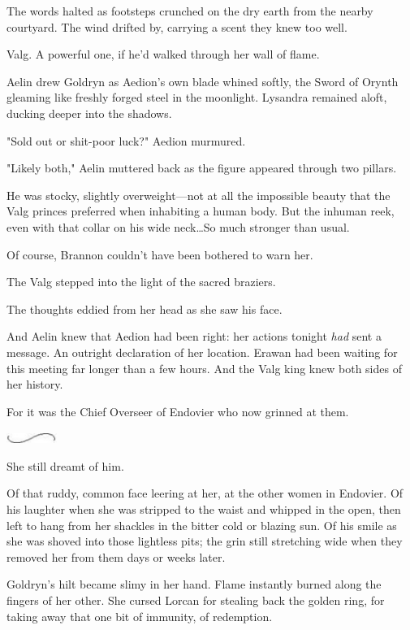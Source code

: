 The words halted as footsteps crunched on the dry earth from the nearby courtyard.
The wind drifted by, carrying a scent they knew too well.

Valg.
A powerful one, if he'd walked through her wall of flame.

Aelin drew Goldryn as Aedion's own blade whined softly, the Sword of Orynth gleaming like freshly forged steel in the moonlight.
Lysandra remained aloft, ducking deeper into the shadows.

"Sold out or shit-poor luck?"
Aedion murmured.

"Likely both," Aelin muttered back as the figure appeared through two pillars.

He was stocky, slightly overweight---not at all the impossible beauty that the Valg princes preferred when inhabiting a human body.
But the inhuman reek, even with that collar on his wide neck\ldots So much stronger than usual.

Of course, Brannon couldn't have been bothered to warn her.

The Valg stepped into the light of the sacred braziers.

The thoughts eddied from her head as she saw his face.

And Aelin knew that Aedion had been right: her actions tonight \emph{had} sent a message.
An outright declaration of her location.
Erawan had been waiting for this meeting far longer than a few hours.
And the Valg king knew both sides of her history.

For it was the Chief Overseer of Endovier who now grinned at them.

\begin{center}
	\includegraphics[width=0.65in,height=0.13in]{images/seperator}
\end{center}

She still dreamt of him.

Of that ruddy, common face leering at her, at the other women in Endovier.
Of his laughter when she was stripped to the waist and whipped in the open, then left to hang from her shackles in the bitter cold or blazing sun.
Of his smile as she was shoved into those lightless pits;
the grin still stretching wide when they removed her from them days or weeks later.

Goldryn's hilt became slimy in her hand.
Flame instantly burned along the fingers of her other.
She cursed Lorcan for stealing back the golden ring, for taking away that one bit of immunity, of redemption.

